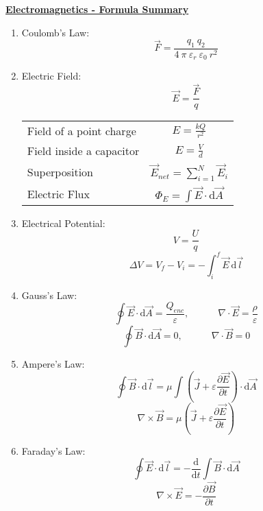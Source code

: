 \documentclass[a4paper, 11pt]{article}
\begin{document}
\underline{\Large{\textbf{Electromagnetics - Formula Summary}}} \vspace{.5cm}
\begin{multicols}{2}
\begin{enumerate}
    \item Coulomb's Law:
    \[
        \vec{F} = \frac{q_{1} \ q_{2}}{4 \ \pi \ \varepsilon_{r} \ \varepsilon_{0} \ r^{2}}
    \]

    \item Electric Field:
    \[
        \vec{E} = \frac{\vec{F}}{q}
    \]
    \begin{table}[H]
        \centering
        \begin{tabular}{l|c}
        \toprule
        Field of a point charge & $\displaystyle E = \frac{kQ}{r^{2}}$ \\ [1em]
        Field inside a capacitor    & $\displaystyle E = \frac{V}{d}$ \\ [1em]
        Superposition   &   $\displaystyle \vec{E}_{net} = \sum_{i=1}^{N}\vec{E}_{i}$ \\ [1em]
        Electric Flux   &   $\displaystyle \Phi_{E} = \int \vec{E} \cdot \mathrm{d}\vec{A}$\\
        \bottomrule
        \end{tabular}
    \end{table}
    

    \item Electrical Potential:
    \[
    V = \frac{U}{q}
    \] 
    \[
        \Delta V = V_{f}-V_{i} = -\int_{i}^{f} \vec{E}\ \mathrm{d} \vec{l}
    \]

    \item Gauss's Law:
    \[
        \oint \vec{E} \cdot \mathrm{d}\vec{A} = \frac{Q_{enc}}{\varepsilon}, 
        \quad \quad \quad 
        \nabla \cdot \vec{E} = \frac{\rho}{\varepsilon}
    \]
    \[
        \oint \vec{B} \cdot \mathrm{d}\vec{A} = 0, 
        \quad \quad \quad 
        \nabla \cdot \vec{B} = 0
    \]
    
    \item Ampere's Law:
    \[
        \oint \vec{B} \cdot \mathrm{d}\vec{l} = \mu \int(\vec{J}+\varepsilon \frac{\partial \vec{E}}{\partial t}) \cdot \mathrm{d}\vec{A} 
    \]
    \[
        \nabla \times \vec{B} = \mu(\vec{J}+\varepsilon \frac{\partial \vec{E}}{\partial t})
    \]
    
    \item Faraday's Law:
    \[
        \oint \vec{E} \cdot \mathrm{d}\vec{l} = -\frac{\mathrm{d}}{\mathrm{d}t} \int\vec{B} \cdot \mathrm{d}\vec{A} 
    \]
    \[
        \nabla 
        \times \vec{E} = - \frac{\partial \vec{B}}{\partial t}
    \]


\end{enumerate}
\end{multicols}
\end{document}
